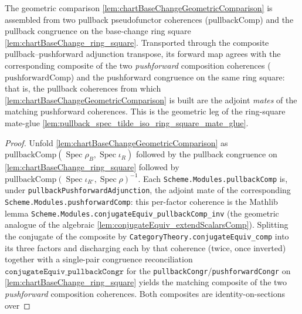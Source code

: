 \begin{lemma}

  \label{lem:chartBaseChangeGeometricComparison_mate}
  The geometric comparison \cref{lem:chartBaseChangeGeometricComparison} is assembled from two
  pullback pseudofunctor coherences (\(\mathrm{pullbackComp}\)) and the pullback congruence on the
  base-change ring square \cref{lem:chartBaseChange_ring_square}. Transported through the composite
  pullback--pushforward adjunction transpose, its forward map agrees with the corresponding composite
  of the two \emph{pushforward} composition coherences (\(\mathrm{pushforwardComp}\)) and the
  pushforward congruence on the same ring square: that is, the pullback coherences from which
  \cref{lem:chartBaseChangeGeometricComparison} is built are the adjoint \emph{mates} of the
  matching pushforward coherences. This is the geometric leg of the ring-square mate-glue
  \cref{lem:pullback_spec_tilde_iso_ring_square_mate_glue}.
  \begin{proof}
    Unfold \cref{lem:chartBaseChangeGeometricComparison} as
    \(\mathrm{pullbackComp}(\operatorname{Spec}\rho_B,\operatorname{Spec}\iota_R)\) followed by the
    pullback congruence on \cref{lem:chartBaseChange_ring_square} followed by
    \(\mathrm{pullbackComp}(\operatorname{Spec}\iota_{R'},\operatorname{Spec}\rho)^{-1}\). Each
    \texttt{Scheme.Modules.pullbackComp} is, under \texttt{pullbackPushforwardAdjunction}, the adjoint
    mate of the corresponding \texttt{Scheme.Modules.pushforwardComp}: this per-factor coherence is the
    Mathlib lemma \texttt{Scheme.Modules.conjugateEquiv\_pullbackComp\_inv} (the geometric analogue of
    the algebraic \cref{lem:conjugateEquiv_extendScalarsComp}). Splitting the conjugate of the composite
    by \texttt{CategoryTheory.conjugateEquiv\_comp} into its three factors and discharging each by that
    coherence (twice, once inverted) together with a single-pair congruence reconciliation
    \(\texttt{conjugateEquiv\_pullbackCongr}\) for the \texttt{pullbackCongr}/\texttt{pushforwardCongr}
    on \cref{lem:chartBaseChange_ring_square} yields the matching composite of the two
    \emph{pushforward} composition coherences. Both composites are identity-on-sections over

\end{proof}
\end{lemma}
